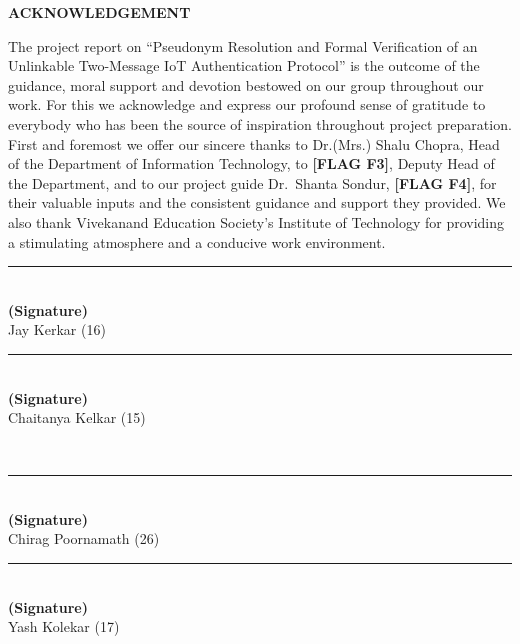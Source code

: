 \documentclass[12pt,a4paper,oneside]{report}
\numberwithin{equation}{chapter}
\newcommand{\flag}[1]{\textcolor{flagred}{\textbf{[FLAG #1]}}}
\newcommand{\ProjectTitle}{Pseudonym Resolution and Formal Verification of an Unlinkable Two-Message IoT Authentication Protocol}
\newcommand{\prelimtitle}[2][\itshape]{%
  \begin{center}{\georgia\bfseries#1\fontsize{16}{20}\selectfont #2\par}\end{center}\vspace{18pt}}
\newcommand{\sigblock}[1]{%
  \begin{minipage}[t]{0.46\textwidth}\centering
  \rule{1.4in}{0.4pt}\\[-2pt]{\bfseries (Signature)}\\#1\end{minipage}}
\newcommand{\StudentA}{Jay Kerkar}
\newcommand{\StudentB}{Chaitanya Kelkar}
\newcommand{\StudentC}{Chirag Poornamath}
\newcommand{\StudentD}{Yash Kolekar}
\newcommand{\RollA}{16}
\newcommand{\RollB}{15}
\newcommand{\RollC}{26}
\newcommand{\RollD}{17}
\newcommand{\GuideName}{Dr.\ Shanta Sondur}
\begin{document}
\tableofcontents
\clearpage
\listoffigures
\clearpage
\listoftables
\clearpage

\prelimtitle[\upshape]{ACKNOWLEDGEMENT}
The project report on ``\ProjectTitle'' is the outcome of the guidance, moral support and devotion bestowed on our group throughout our work. For this we acknowledge and express our profound sense of gratitude to everybody who has been the source of inspiration throughout project preparation. First and foremost we offer our sincere thanks to Dr.(Mrs.) Shalu Chopra, Head of the Department of Information Technology, to \flag{F3}, Deputy Head of the Department, and to our project guide \GuideName, \flag{F4}, for their valuable inputs and the consistent guidance and support they provided. We also thank Vivekanand Education Society's Institute of Technology for providing a stimulating atmosphere and a conducive work environment.

\vspace{0.8in}
\noindent\sigblock{\StudentA{} (\RollA)}\hfill\sigblock{\StudentB{} (\RollB)}\\[0.7in]
\noindent\sigblock{\StudentC{} (\RollC)}\hfill\sigblock{\StudentD{} (\RollD)}

\clearpage
{}
\setcounter{page}{1}






\end{document}
